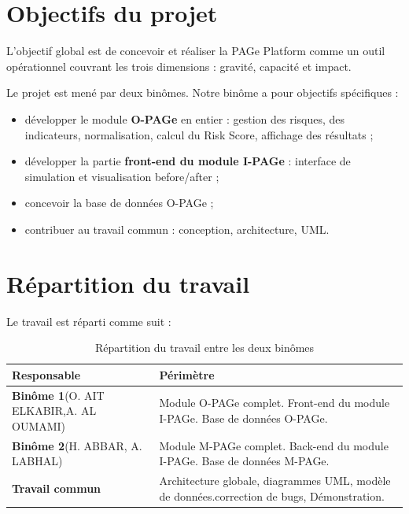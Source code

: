 \section{Objectifs du projet}
L'objectif global est de concevoir et réaliser la PAGe Platform comme un outil opérationnel couvrant les trois dimensions : gravité, capacité et impact.

Le projet est mené par deux binômes. Notre binôme a pour objectifs spécifiques :
\begin{itemize}
    \item développer le module \textbf{O-PAGe} en entier : gestion des risques, des indicateurs, normalisation, calcul du Risk Score, affichage des résultats ;
    \item développer la partie \textbf{front-end du module I-PAGe} : interface de simulation et visualisation before/after ;
    \item concevoir la base de données O-PAGe ;
    \item contribuer au travail commun : conception, architecture, UML.
\end{itemize}
\section{Répartition du travail}
Le travail est réparti comme suit :

\begin{table}[h]
\centering
\renewcommand{\arraystretch}{1.35}
\begin{tabular}{@{}p{}p{}@{}}
\hline
\textbf{Responsable} & \textbf{Périmètre} \\
\hline
\textbf{Binôme 1}\newline (O. AIT ELKABIR,\newline A. AL OUMAMI) &
    Module O-PAGe complet.\newline
    Front-end du module I-PAGe.\newline
    Base de données O-PAGe. \\
\hline
\textbf{Binôme 2}\newline (H. ABBAR, A. LABHAL) &
    Module M-PAGe complet.\newline
    Back-end du module I-PAGe.\newline
    Base de données M-PAGe. \\
\hline
\textbf{Travail commun} &
    Architecture globale, diagrammes UML, modèle de données.\newline correction de bugs, Démonstration. \\
\hline
\end{tabular}
\caption{Répartition du travail entre les deux binômes}
\end{table}
\vspace{5cm}
